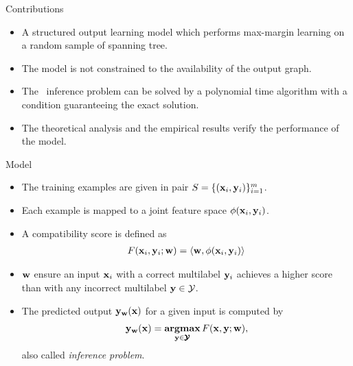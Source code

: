 \documentclass[first=dgreen,second=purple,logo=yellowexc]{aaltoslides}
\begin{document}
%
\begin{frame}{Contributions}
	\begin{itemize}
		\item A structured output learning model which performs max-margin learning on a random sample of spanning tree.
		\item The model is not constrained to the availability of the output graph.
		\item The \nphard\ inference problem can be solved by a polynomial time algorithm with a condition guaranteeing the exact solution.
		\item The theoretical analysis and the empirical results verify the performance of the model.
	\end{itemize}
\end{frame}



%
\begin{frame}{Model}
	\begin{itemize}
		\item The training examples are given in pair $S=\{(\mathbf {x}_i,\mathbf {y}_i)\}_{i=1}^{m}$.
		\item Each example is mapped to a joint feature space $\phi(\mathbf {x}_i,\mathbf {y}_i)$.
		\item A compatibility score is defined as
		\begin{align*}
			F(\mathbf {x}_i,\mathbf {y}_i;\mathbf {w}) = \langle \mathbf {w}, \phi(\mathbf {x}_i,\mathbf {y}_i) \rangle
		\end{align*} 
		\item $\mathbf {w}$ ensure an input $\mathbf {x}_i$ with a correct multilabel $\mathbf {y}_i$ achieves a higher score than with any incorrect multilabel $\mathbf {y}\in\mathcal{Y}$.
		\item The predicted output $\mathbf {y}_{\mathbf {w}}(\mathbf {x})$ for a given input is computed by
		\begin{align*}
			\mathbf {y}_{\mathbf {w}}(\mathbf {x}) = \underset{\mathbf {y}\in\pmb {\mathcal{Y}}}{\textbf{argmax}}\,F(\mathbf {x},\mathbf {y};\mathbf {w}),
		\end{align*}
		also called \textit{inference problem}.
	\end{itemize}
\end{frame}


\iffalse
\begin{frame}[allowframebreaks]{Bibliography}
	
	
\end{frame}
\fi
\end{document}
